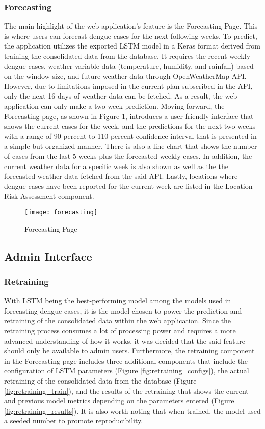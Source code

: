 \subsubsection{Forecasting}

The main highlight of the web application's feature is the Forecasting Page. This is where users can forecast dengue cases for the next following weeks. To predict, the application utilizes the exported LSTM model in a Keras format derived from training the consolidated data from the database. It requires the recent weekly dengue cases, weather variable data (temperature, humidity, and rainfall) based on the window size, and future weather data through OpenWeatherMap API. However, due to limitations imposed in the current plan subscribed in the API, only the next 16 days of weather data can be fetched. As a result, the web application can only make a two-week prediction. Moving forward, the Forecasting page, as shown in Figure \ref{fig:forecasting}, introduces a user-friendly interface that shows the current cases for the week, and the predictions for the next two weeks with a range of 90 percent to 110 percent confidence interval that is presented in a simple but organized manner. There is also a line chart that shows the number of cases from the last 5 weeks plus the forecasted weekly cases. In addition, the current weather data for a specific week is also shown as well as the the forecasted weather data fetched from the said API. Lastly, locations where dengue cases have been reported for the current week are listed in the Location Risk Assessment component. 

\begin{figure}[H]
	\centering
	\texttt{[image: forecasting]}
	\caption{Forecasting Page}
	\label{fig:forecasting}
\end{figure}

\subsection{Admin Interface}

\subsubsection{Retraining}

With LSTM being the best-performing model among the models used in forecasting dengue cases, it is the model chosen to power the prediction and retraining of the consolidated data within the web application. Since the retraining process consumes a lot of processing power and requires a more advanced understanding of how it works, it was decided that the said feature should only be available to admin users. Furthermore, the retraining component in the Forecasting page includes three additional components that include the configuration of LSTM parameters (Figure \ref{fig:retraining_configs}), the actual retraining of the consolidated data from the database (Figure \ref{fig:retraining_train}), and the results of the retraining that shows the current and previous model metrics depending on the parameters entered (Figure \ref{fig:retraining_results}). It is also worth noting that when trained, the model used a seeded number to promote reproducibility. 

